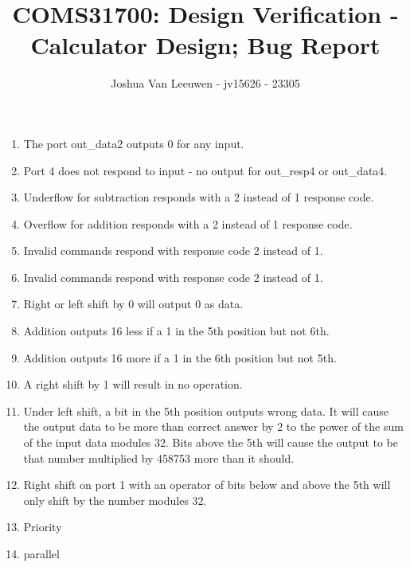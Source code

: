 \documentclass[a4paper]{article}
\title{\vspace{-0.7em}COMS31700: Design Verification - Calculator Design; Bug Report\vspace{-0.7em}}
\author{Joshua Van Leeuwen - jv15626 - 23305}
\date{}
\begin{document}
\vspace{-10em}
\maketitle

\vspace{-5.1em}
\begin{enumerate}
    \item The port out\_data2 outputs 0 for any input.
    \item Port 4 does not respond to input - no output for out\_resp4 or out\_data4.
    \item Underflow for subtraction responds with a 2 instead of 1 response code.
    \item Overflow for addition responds with a 2 instead of 1 response code.
    \item Invalid commands respond with response code 2 instead of 1.
    \item Invalid commands respond with response code 2 instead of 1.
    \item Right or left shift by 0 will output 0 as data.
    \item Addition outputs 16 less if a 1 in the 5th position but not 6th.
    \item Addition outputs 16 more if a 1 in the 6th position but not 5th.
    \item A right shift by 1 will result in no operation.
    \item Under left shift, a bit in the 5th position outputs wrong data. It will cause the output data to be more than correct answer by 2 to the power of the sum of the input data modules 32. Bits above the 5th will cause the output to be that number multiplied by 458753 more than it should.
    \item Right shift on port 1 with an operator of bits below and above the 5th will only shift by the number modules 32.
    \item Priority
    \item parallel
\end{enumerate}
\end{document}
